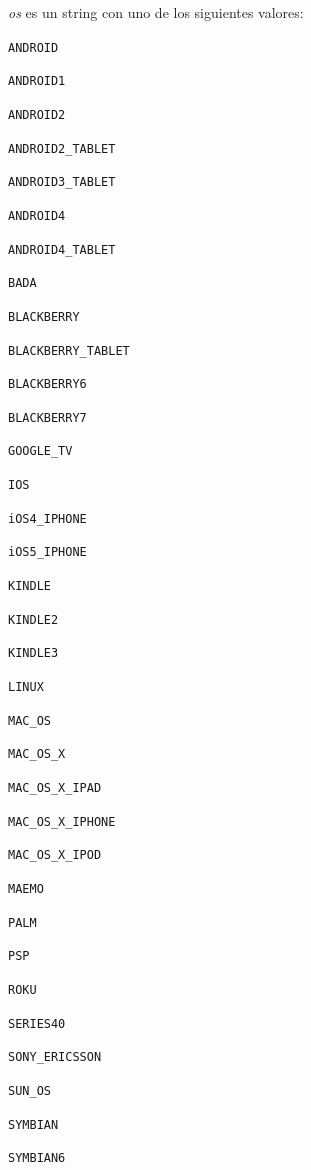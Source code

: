 \documentclass[11pt,a4paper,titlepage]{article}
\begin{document}
\textit{os} es un string con uno de los siguientes valores:

\begin{multicols}{4}

    \small \texttt{ANDROID}

    \small \texttt{ANDROID1}

    \small \texttt{ANDROID2}

    \small \texttt{ANDROID2\_TABLET}

    \small \texttt{ANDROID3\_TABLET}

    \small \texttt{ANDROID4}

    \small \texttt{ANDROID4\_TABLET}

    \small \texttt{BADA}

    \small \texttt{BLACKBERRY}

    \small \texttt{BLACKBERRY\_TABLET}

    \small \texttt{BLACKBERRY6}

    \small \texttt{BLACKBERRY7}

    \small \texttt{GOOGLE\_TV}

    \small \texttt{IOS}

    \small \texttt{iOS4\_IPHONE}

    \small \texttt{iOS5\_IPHONE}

    \small \texttt{KINDLE}

    \small \texttt{KINDLE2}

    \small \texttt{KINDLE3}

    \small \texttt{LINUX}

    \small \texttt{MAC\_OS}

    \small \texttt{MAC\_OS\_X}

    \small \texttt{MAC\_OS\_X\_IPAD}

    \small \texttt{MAC\_OS\_X\_IPHONE}

    \small \texttt{MAC\_OS\_X\_IPOD}

    \small \texttt{MAEMO}

    \small \texttt{PALM}

    \small \texttt{PSP}

    \small \texttt{ROKU}

    \small \texttt{SERIES40}

    \small \texttt{SONY\_ERICSSON}

    \small \texttt{SUN\_OS}

    \small \texttt{SYMBIAN}

    \small \texttt{SYMBIAN6}


\end{multicols}
\end{document}
